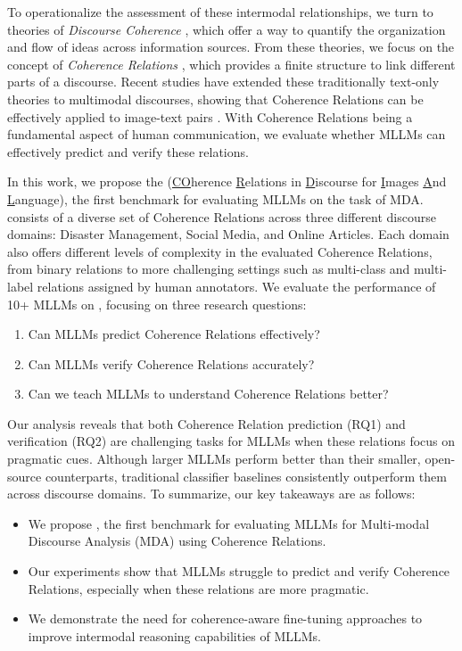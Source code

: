 To operationalize the assessment of these intermodal relationships, we turn to theories of {\em Discourse Coherence} \cite{Hobbs1978-em}, which offer a way to quantify the organization and flow of ideas across information sources. From these theories, we focus on the concept of {\em Coherence Relations} \cite{Alikhani2019-dz}, which provides a finite structure to link different parts of a discourse. Recent studies have extended these traditionally text-only theories to multimodal discourses, showing that Coherence Relations can be effectively applied to image-text pairs \cite{Alikhani2020-nr}. With Coherence Relations being a fundamental aspect of human communication, we evaluate whether MLLMs can effectively predict and verify these relations.

In this work, we propose the {\name} (\underline{CO}herence \underline{R}elations in \underline{D}iscourse for \underline{I}mages \underline{A}nd \underline{L}anguage), the first benchmark for evaluating MLLMs on the task of MDA. {\name} consists of a diverse set of Coherence Relations across three different discourse domains: Disaster Management, Social Media, and Online Articles. Each domain also offers different levels of complexity in the evaluated Coherence Relations, from binary relations to more challenging settings such as multi-class and multi-label relations assigned by human annotators. We evaluate the performance of 10+ MLLMs on {\name}, focusing on three research questions: 

{\bf
\begin{enumerate}[leftmargin=1cm, label=RQ\arabic*:, itemsep=-0.5ex]
    \item Can MLLMs predict Coherence Relations effectively?
    \item Can MLLMs verify Coherence Relations accurately?
    \item Can we teach MLLMs to understand Coherence Relations better?
\end{enumerate}
}

Our analysis reveals that both Coherence Relation prediction (RQ1) and verification (RQ2) are challenging tasks for MLLMs when these relations focus on pragmatic cues. Although larger MLLMs perform better than their smaller, open-source counterparts, traditional classifier baselines consistently outperform them across discourse domains. To summarize, our key takeaways are as follows:

\begin{itemize}[leftmargin=3.3mm]
    \item We propose {\name}, the first benchmark for evaluating MLLMs for Multi-modal Discourse Analysis (MDA) using Coherence Relations.
    \item Our experiments show that MLLMs struggle to predict and verify Coherence Relations, especially when these relations are more pragmatic.
    \item We demonstrate the need for coherence-aware fine-tuning approaches to improve intermodal reasoning capabilities of MLLMs.
\end{itemize}

